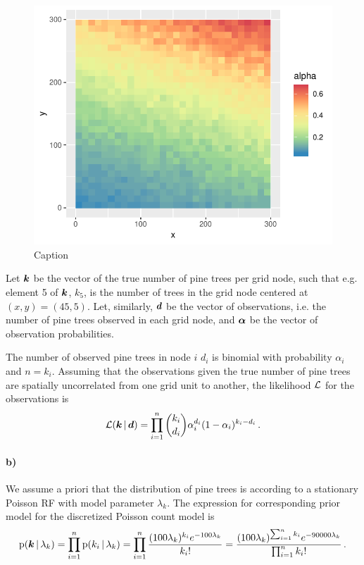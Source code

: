 \begin{figure}
    \centering
    \includegraphics{figures/p2_alpha.pdf}
    \caption{Caption}
    \label{fig:p2_alpha}
\end{figure}

Let $\bm{k}$ be the vector of the true number of pine trees per grid node, such that e.g. element 5 of $\bm{k}$, $k_5$, is the number of trees in the grid node centered at $(x, y) = (45, 5)$. Let, similarly, $\bm{d}$ be the vector of observations, i.e. the number of pine trees observed in each grid node, and $\bm{\alpha}$ be the vector of observation probabilities.

The number of observed pine trees in node $i$ $d_i$ is binomial with probability $\alpha_i$ and $n = k_i$. Assuming that the observations given the true number of pine trees are spatially uncorrelated from one grid unit to another, the likelihood $\mathcal{L}$ for the observations is
%
\begin{equation*}
    \mathcal{L}(\bm{k} \, | \, \bm{d}) = \prod_{i=1}^n \binom{k_i}{d_i} \alpha_i^{d_i} (1 - \alpha_i)^{k_i - d_i} \, .
\end{equation*}

\paragraph{b)}
We assume a priori that the distribution of pine trees is according to a stationary Poisson RF with model parameter $\lambda_k$. The expression for corresponding prior model for the discretized Poisson count model is
%
\begin{equation*}
    \mathrm{p}(\bm{k} \, | \, \lambda_k) = \prod_{i=1}^n \mathrm{p}(k_i \, | \, \lambda_k) = \prod_{i=1}^n \frac{(100\lambda_k)^{k_i} e^{-100\lambda_k}}{k_i!} = \frac{(100\lambda_k)^{\sum_{i=1}^n k_i} e^{-90000\lambda_k}}{\prod_{i=1}^n k_i!} \, .
\end{equation*}


